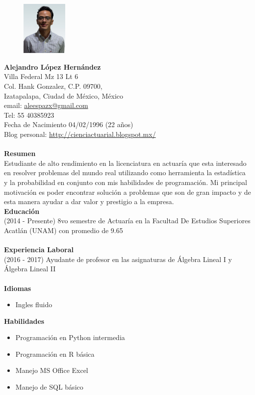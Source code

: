 \documentclass[11pt,letter]{article}
\begin{document}
\pagestyle{empty}
\noindent
\begin{figure}
    \centering
    \includegraphics[width=0.2\textwidth]{CV}
\end{figure} 
\Large{\textbf{Alejandro López Hernández}}  
\\
\normalsize
Villa Federal Mz 13 Lt 6\\ Col. Hank Gonzalez, C.P. 09700, \\Izatapalapa, Ciudad de México, México\\ email: \href{mailto:aleespazx@gmail.com}{aleespazx@gmail.com}\\Tel: 55 40385923 \\ Fecha de Nacimiento 04/02/1996 (22 años)\\ Blog personal: \url{http://cienciactuarial.blogspot.mx/}\\\\
\noindent
\textbf{Resumen}\\
Estudiante de alto rendimiento en la licenciatura en actuaría que esta interesado en resolver problemas del mundo real utilizando como herramienta la estadística y la probabilidad en conjunto con mis habilidades de programación. Mi principal motivación es poder encontrar solución a problemas que son de gran impacto y de esta manera ayudar a dar valor y prestigio a la empresa. \\
\textbf{Educación}\\
(2014 - Presente) 8vo semestre de Actuaría en la Facultad De Estudios Superiores Acatlán (UNAM) con promedio de 9.65\\\\
\textbf{Experiencia Laboral}\\
(2016 - 2017) \quad Ayudante de profesor en las asignaturas de Álgebra Lineal I y Álgebra Lineal II\\\\
\textbf{Idiomas}
\begin{itemize}
\item Ingles fluido
\end{itemize}
\textbf{Habilidades}
\begin{itemize}
\item Programación en Python intermedia
\item Programación en R básica
\item Manejo MS Office Excel
\item Manejo de SQL básico
\end{itemize}
\end{document}

